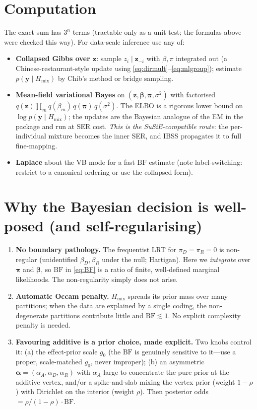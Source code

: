 \documentclass[11pt]{article}
\newcommand{\BF}{\mathrm{BF}}
\newcommand{\Dir}{\mathrm{Dirichlet}}
\begin{document}
\section{Computation}
The exact sum has $3^n$ terms (tractable only as a unit test; the formulas above
were checked this way). For data-scale inference use any of:
\begin{itemize}\itemsep1pt
\item\textbf{Collapsed Gibbs over $\bm z$}: sample $z_i\mid\bm z_{-i}$ with
$\beta,\pi$ integrated out (a Chinese-restaurant-style update using
\eqref{eq:dirmult}--\eqref{eq:mlgroup}); estimate $p(\bm y\mid H_{\mathrm{mix}})$
by Chib's method or bridge sampling.
\item\textbf{Mean-field variational Bayes} on $(\bm z,\bm\beta,\bm\pi,\sigma^2)$
with factorised $q(\bm z)\prod_m q(\beta_m)\,q(\bm\pi)\,q(\sigma^2)$. The ELBO is
a rigorous lower bound on $\log p(\bm y\mid H_{\mathrm{mix}})$; the updates are the
Bayesian analogue of the EM in the package and run at SER cost. \emph{This is the
SuSiE-compatible route}: the per-individual mixture becomes the inner SER, and
IBSS propagates it to full fine-mapping.
\item\textbf{Laplace} about the VB mode for a fast $\BF$ estimate (note
label-switching: restrict to a canonical ordering or use the collapsed form).
\end{itemize}

\section{Why the Bayesian decision is well-posed (and self-regularising)}
\begin{enumerate}\itemsep1pt
\item\textbf{No boundary pathology.} The frequentist LRT for $\pi_D=\pi_R=0$ is
non-regular (unidentified $\beta_D,\beta_R$ under the null; Hartigan). Here we
\emph{integrate} over $\bm\pi$ and $\bm\beta$, so $\BF$ in \eqref{eq:BF} is a
ratio of finite, well-defined marginal likelihoods. The non-regularity simply
does not arise.
\item\textbf{Automatic Occam penalty.} $H_{\mathrm{mix}}$ spreads its prior mass
over many partitions; when the data are explained by a single coding, the
non-degenerate partitions contribute little and $\BF\!\lesssim\!1$. No explicit
complexity penalty is needed.
\item\textbf{Favouring additive is a prior choice, made explicit.} Two knobs
control it: (a) the effect-prior scale $g_0$ (the $\BF$ is genuinely sensitive to
it---use a proper, scale-matched $g_0$, never improper); (b) an asymmetric
$\bm\alpha=(\alpha_A,\alpha_D,\alpha_R)$ with $\alpha_A$ large to concentrate the
pure prior at the additive vertex, and/or a spike-and-slab mixing the vertex
prior (weight $1-\rho$) with $\Dir$ on the interior (weight $\rho$). Then
posterior odds $=\rho/(1-\rho)\cdot\BF$.
\end{enumerate}
\end{document}

